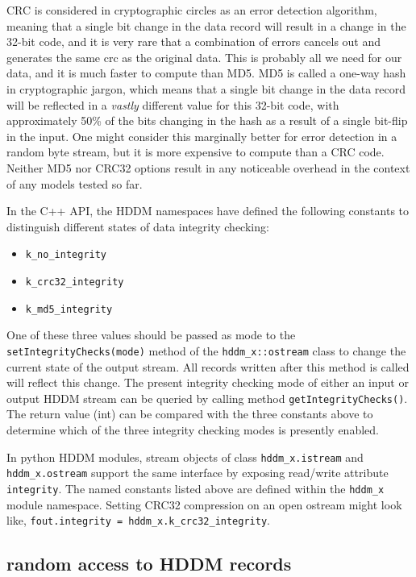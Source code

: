\documentclass{revtex4}
\begin{document}
CRC is considered in cryptographic circles as an error detection algorithm,
meaning that a single bit change in the data record will result in a
change in the 32-{}bit code, and it is very rare that a combination of
errors cancels out and generates the same crc as the original data. This
is probably all we need for our data, and it is much faster to compute than
MD5. MD5 is called a one-{}way hash in cryptographic jargon, which means that
a single bit change in the data record will be reflected in a {\em vastly}
different value for this 32-{}bit code, with approximately 50\% of the bits
changing in the hash as a result of a single bit-{}flip in the input. One might
consider this marginally better for error detection in a random byte stream,
but it is more expensive to compute than a CRC code. Neither MD5 nor CRC32
options result in any noticeable overhead in the context of any models tested
so far.

In the C++ API, the HDDM namespaces have defined the following constants to
distinguish different states of data integrity checking:

\begin{itemize}
\item \texttt{k\_no\_integrity}
\item \texttt{k\_crc32\_integrity}
\item \texttt{k\_md5\_integrity}
\end{itemize}

One of these three values should be passed as mode to the 
\texttt{setIntegrityChecks(mode)} method of the \texttt{hddm\_x::ostream}
class to change the current state of the output stream. All records written
after this method is called will reflect this change. The present integrity
checking mode of either an input or output HDDM stream can be queried by
calling method \texttt{getIntegrityChecks()}. The return value (int) can
be compared with the three constants above to determine which of the three
integrity checking modes is presently enabled.

In python HDDM modules, stream objects of class \texttt{hddm\_x.istream}
and \texttt{hddm\_x.ostream} support the same interface by exposing read/write
attribute \texttt{integrity}. The named constants listed above are defined
within the \texttt{hddm\_x} module namespace. Setting CRC32 compression on
an open ostream might look like, \texttt{fout.integrity = hddm\_x.k\_crc32\_integrity}.

\subsection{random access to HDDM records}
\end{document}
